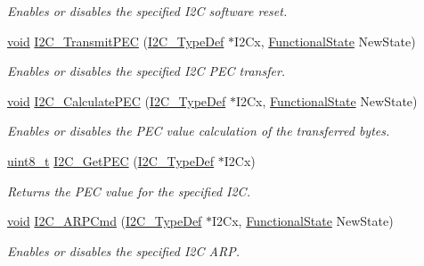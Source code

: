 \begin{DoxyCompactItemize}
\begin{DoxyCompactList}\small\item\em Enables or disables the specified I2C software reset. \end{DoxyCompactList}\item 
\hyperlink{usb__devapi_8h_afabf60e7f57651d6d595a02c75f07cd0}{void} \hyperlink{group___i2_c___exported___functions_gaa27d1440290fe601e730b6980999afe3}{I2\+C\+\_\+\+Transmit\+P\+EC} (\hyperlink{struct_i2_c___type_def}{I2\+C\+\_\+\+Type\+Def} $\ast$I2\+Cx, \hyperlink{agilefox_2library_2inc_2stm32f10x__type_8h_ac9a7e9a35d2513ec15c3b537aaa4fba1}{Functional\+State} New\+State)
\begin{DoxyCompactList}\small\item\em Enables or disables the specified I2C P\+EC transfer. \end{DoxyCompactList}\item 
\hyperlink{usb__devapi_8h_afabf60e7f57651d6d595a02c75f07cd0}{void} \hyperlink{group___i2_c___exported___functions_gae86801251359226c35745e0a258388b0}{I2\+C\+\_\+\+Calculate\+P\+EC} (\hyperlink{struct_i2_c___type_def}{I2\+C\+\_\+\+Type\+Def} $\ast$I2\+Cx, \hyperlink{agilefox_2library_2inc_2stm32f10x__type_8h_ac9a7e9a35d2513ec15c3b537aaa4fba1}{Functional\+State} New\+State)
\begin{DoxyCompactList}\small\item\em Enables or disables the P\+EC value calculation of the transferred bytes. \end{DoxyCompactList}\item 
\hyperlink{_p_e___types_8h_aba7bc1797add20fe3efdf37ced1182c5}{uint8\+\_\+t} \hyperlink{group___i2_c___exported___functions_ga7bf75e7c27c0e1d73e70fc0e1c7cd1dd}{I2\+C\+\_\+\+Get\+P\+EC} (\hyperlink{struct_i2_c___type_def}{I2\+C\+\_\+\+Type\+Def} $\ast$I2\+Cx)
\begin{DoxyCompactList}\small\item\em Returns the P\+EC value for the specified I2C. \end{DoxyCompactList}\item 
\hyperlink{usb__devapi_8h_afabf60e7f57651d6d595a02c75f07cd0}{void} \hyperlink{group___i2_c___exported___functions_ga66d86742bf1be58b17ef8779ffc79d02}{I2\+C\+\_\+\+A\+R\+P\+Cmd} (\hyperlink{struct_i2_c___type_def}{I2\+C\+\_\+\+Type\+Def} $\ast$I2\+Cx, \hyperlink{agilefox_2library_2inc_2stm32f10x__type_8h_ac9a7e9a35d2513ec15c3b537aaa4fba1}{Functional\+State} New\+State)
\begin{DoxyCompactList}\small\item\em Enables or disables the specified I2C A\+RP. \end{DoxyCompactList}\item 

\end{DoxyCompactItemize}
